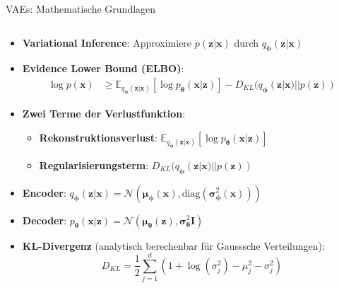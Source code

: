 \documentclass[aspectratio=1610, xcolor=dvipsnames, 9pt]{beamer}
\begin{document}
\begin{frame}{VAEs: Mathematische Grundlagen}
  \begin{columns}
    \begin{column}{1\textwidth}
      \begin{itemize}
        \item \textbf{Variational Inference}: Approximiere $p(\mathbf{z}|\mathbf{x})$ durch $q_{\boldsymbol{\phi}}(\mathbf{z}|\mathbf{x})$
        \item \textbf{Evidence Lower Bound (ELBO)}:
        \begin{align}
          \log p(\mathbf{x}) &\geq \mathbb{E}_{q_{\boldsymbol{\phi}}(\mathbf{z}|\mathbf{x})}[\log p_{\boldsymbol{\theta}}(\mathbf{x}|\mathbf{z})] - D_{KL}(q_{\boldsymbol{\phi}}(\mathbf{z}|\mathbf{x}) || p(\mathbf{z}))
        \end{align}
        \item \textbf{Zwei Terme der Verlustfunktion}:
        \begin{itemize}
          \item \textbf{Rekonstruktionsverlust}: $\mathbb{E}_{q_{\boldsymbol{\phi}}(\mathbf{z}|\mathbf{x})}[\log p_{\boldsymbol{\theta}}(\mathbf{x}|\mathbf{z})]$
          \item \textbf{Regularisierungsterm}: $D_{KL}(q_{\boldsymbol{\phi}}(\mathbf{z}|\mathbf{x}) || p(\mathbf{z}))$
        \end{itemize}
        \item \textbf{Encoder}: $q_{\boldsymbol{\phi}}(\mathbf{z}|\mathbf{x}) = \mathcal{N}(\boldsymbol{\mu}_{\boldsymbol{\phi}}(\mathbf{x}), \text{diag}(\boldsymbol{\sigma}_{\boldsymbol{\phi}}^2(\mathbf{x})))$
        \item \textbf{Decoder}: $p_{\boldsymbol{\theta}}(\mathbf{x}|\mathbf{z}) = \mathcal{N}(\boldsymbol{\mu}_{\boldsymbol{\theta}}(\mathbf{z}), \boldsymbol{\sigma}_{\boldsymbol{\theta}}^2 \mathbf{I})$
        \item \textbf{KL-Divergenz} (analytisch berechenbar für Gausssche Verteilungen):
        \begin{equation}
          D_{KL} = \frac{1}{2} \sum_{j=1}^{d} (1 + \log(\sigma_j^2) - \mu_j^2 - \sigma_j^2)
        \end{equation}
      \end{itemize}
    \end{column}
  \end{columns}
\end{frame}
\end{document}
